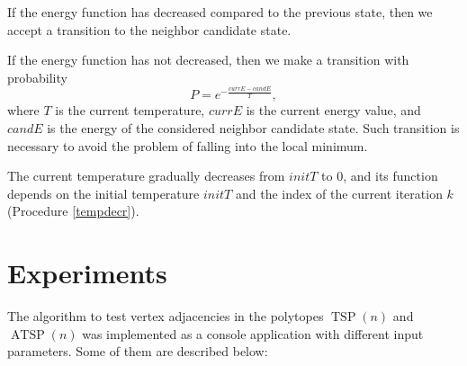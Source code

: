 \documentclass[runningheads]{llncs}
\DeclareMathOperator\TSP {TSP}
\DeclareMathOperator\ATSP {ATSP}
\begin{document}
If the energy function has decreased compared to the previous state, then we accept a transition to the neighbor candidate state.  %

If the energy function has not decreased, then we make a transition with probability
\[P = e^{-\frac{currE - candE}{T}},\]
where $T$ is the current temperature, $currE$ is the current energy value, and $candE$ is the energy of the considered neighbor candidate state.
Such transition is necessary to avoid the problem of falling into the local minimum. %

The current temperature gradually decreases from $initT$ to $0$, and its function depends on the initial temperature $initT$ and the index of the current iteration $k$ (Procedure \ref{tempdecr}).

\DontPrintSemicolon
{}
\begin{algorithm}[!htbp]
	\label{tempdecr}
	\caption{Cooling schedule}
	
	\BlankLine
	\Proc{\coolingSchedule{\k}}{
		\Return  \startTemp / \k\;
	}
	\BlankLine
\end{algorithm}





\section{Experiments} %

The algorithm to test vertex adjacencies in the polytopes $\TSP(n)$ and $\ATSP(n)$ was implemented as a console application with different input parameters. Some of them are described below: %
\end{document}
